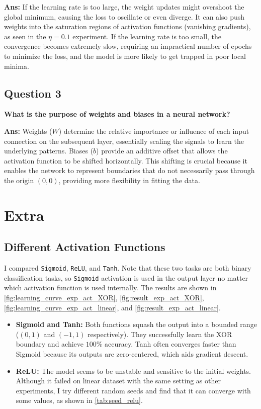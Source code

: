 \documentclass[10pt,twocolumn,letterpaper]{article}
\begin{document}
\textbf{Ans:} If the learning rate is too large, the weight updates might
overshoot the global minimum, causing the loss to oscillate or even
diverge. It can also push weights into the saturation regions of
activation functions (vanishing gradients), as seen in the $\eta=0.1$
experiment. If the learning rate is too small, the convergence
becomes extremely slow, requiring an impractical number of epochs to
minimize the loss, and the model is more likely to get trapped in
poor local minima.

\subsection{Question 3}
\textbf{What is the purpose of weights and biases in a neural network?}

\textbf{Ans:} Weights ($W$) determine the relative importance or
influence of each input connection on the subsequent layer, essentially
scaling the signals to learn the underlying patterns. Biases ($b$) provide
an additive offset that allows the activation function to be shifted
horizontally. This shifting is crucial because it enables the network
to represent boundaries that do not necessarily pass through the
origin $(0,0)$, providing more flexibility in fitting the data.


\section{Extra}

\subsection{Different Activation Functions}

I compared \texttt{Sigmoid}, \texttt{ReLU}, and \texttt{Tanh}.
Note that these two tasks are both binary classification tasks, so
\texttt{Sigmoid} activation is used in the output layer no matter which
activation function is used internally. The results are shown in
\cref{fig:learning_curve_exp_act_XOR}, \cref{fig:result_exp_act_XOR},
\cref{fig:learning_curve_exp_act_linear}, and \cref{fig:result_exp_act_linear}.
\begin{itemize}
    \item \textbf{Sigmoid and Tanh:} Both functions squash the output into
      a bounded range ($(0,1)$ and $(-1,1)$ respectively). They successfully
      learn the XOR boundary and achieve $100\%$ accuracy. Tanh often converges
      faster than Sigmoid because its outputs are zero-centered, which aids
      gradient descent.
    \item \textbf{ReLU:} The model seems to be unstable and sensitive to the
      initial weights. Although it failed on linear dataset with the same setting
      as other experiments, I try different random seeds and find that it
      can converge with some values, as shown in \cref{tab:seed_relu}.
\end{itemize}
\end{document}
